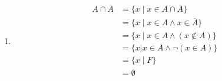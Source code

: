 \documentclass[12pt letter]{report}
\begin{document}
{\begin{enumerate}
\begin{align*}
                                & = \{x  \mid T\} \tag*{By First Negation Law for propositional logic}                       \\
                                & = U \tag*{Definition of Universal set}                                                     \\
          \end{align*}
    \item
          \begin{align*}
            A \cap \overline{A} & = \{ x  \mid x \in A \cap \overline{A}\} \tag*{Set builder notation}                     \\
                                & = \{x  \mid x \in A \wedge x \in \overline{A} \} \tag*{Definition of intersection}       \\
                                & = \{x  \mid x \in A \wedge \left( x \notin A \right)  \} \tag*{Definition of Complement} \\
                                & = \{x | x \in A \wedge  \neg \left( x \in  A \right) \} \tag*{Definition of
            Complement}                                                                                                    \\
                                & = \{x  \mid F\} \tag*{By Second Negation law of propositional logic}                     \\
                                & = \emptyset \tag*{Definition of $\emptyset$}                                             \\
          \end{align*}
  \end{enumerate}
}

\end{document}
